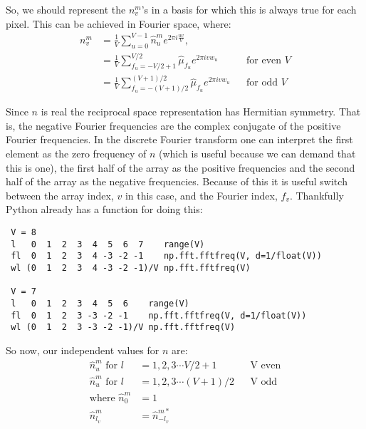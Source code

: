 \documentclass[11pt]{article}
\begin{document}
So, we should represent the $n^m_v$'s in a basis for which this is always true for each pixel. This can be achieved in Fourier space, where:
\begin{align} 
   n^m_v &= \frac{1}{V} \sum_{u=0}^{V-1} \hat{n}^m_u e^{2\pi i \frac{u v}{V}}, &&\\
   &= \frac{1}{V} \sum_{f_u=-V/2+1}^{V/2} \hat{\mu}_{f_u} e^{2\pi i v w_u}       &&\text{for even } V \\
   &= \frac{1}{V} \sum_{f_u=-(V+1)/2}^{(V+1)/2} \hat{\mu}_{f_u} e^{2\pi i v w_u} &&\text{for odd } V
\end{align}

Since $n$ is real the reciprocal space representation has Hermitian symmetry. That is, the negative Fourier frequencies are the complex conjugate of the positive Fourier frequencies. In the discrete Fourier transform one can interpret the first element as the zero frequency of $n$ (which is useful because we can demand that this is one), the first half of the array as the positive frequencies and the second half of the array as the negative frequencies. Because of this it is useful switch between the array index, $v$ in this case, and the Fourier index, $f_v$. Thankfully Python already has a function for doing this:

\begin{verbatim}
 V = 8
 l   0  1  2  3  4  5  6  7    range(V)
 fl  0  1  2  3  4 -3 -2 -1    np.fft.fftfreq(V, d=1/float(V))
 wl (0  1  2  3  4 -3 -2 -1)/V np.fft.fftfreq(V)
 
 V = 7
 l   0  1  2  3  4  5  6    range(V)
 fl  0  1  2  3 -3 -2 -1    np.fft.fftfreq(V, d=1/float(V))
 wl (0  1  2  3 -3 -2 -1)/V np.fft.fftfreq(V)
\end{verbatim}

So now, our independent values for $n$ are:
\begin{align}
   \hat{n}^m_u \text{  for } l &= 1, 2, 3 \cdots V/2 + 1 &&\text{V even}\\
   \hat{n}^m_u \text{  for } l &= 1, 2, 3 \cdots (V+1)/2 &&\text{V odd}\\
\text{where  }   \hat{n}^m_0 &= 1   && \\
                 \hat{n}^m_{l_v} &= \hat{n}^{m*}_{-l_v} &&
\end{align}
\end{document}
